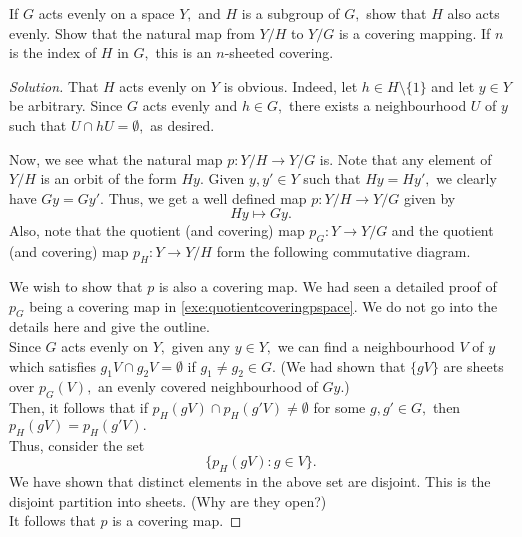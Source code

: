 \documentclass[12pt]{article}
\newenvironment{soln}{\begin{proof}[Solution]}{\end{proof}}
\begin{document}
\begin{exe} \label{exe:evenactionsubgroup}
	If $G$ acts evenly on a space $Y,$ and $H$ is a subgroup of $G,$ show that $H$ also acts evenly. Show that the natural map from $Y/H$ to $Y/G$ is a covering mapping. If $n$ is the index of $H$ in $G,$ this is an $n$-sheeted covering. 
\end{exe}
\begin{soln}
	That $H$ acts evenly on $Y$ is obvious. Indeed, let $h \in H\setminus\{1\}$ and let $y \in Y$ be arbitrary. Since $G$ acts evenly and $h \in G,$ there exists a neighbourhood $U$ of $y$ such that $U \cap hU = \emptyset,$ as desired. \par

	Now, we see what the natural map $p:Y/H \to Y/G$ is. Note that any element of $Y/H$ is an orbit of the form $Hy.$ Given $y, y' \in Y$ such that $Hy = Hy',$ we clearly have $Gy = Gy'.$ Thus, we get a well defined map $p:Y/H \to Y/G$ given by
	\begin{equation*} 
		Hy \mapsto Gy.
	\end{equation*}
	Also, note that the quotient (and covering) map $p_G:Y \to Y/G$ and the quotient (and covering) map $p_H: Y \to Y/H$ form the following commutative diagram.
	\begin{center}
	\end{center}
	We wish to show that $p$ is also a covering map. We had seen a detailed proof of $p_G$ being a covering map in \cref{exe:quotientcoveringpspace}. We do not go into the details here and give the outline.\\
	Since $G$ acts evenly on $Y,$ given any $y \in Y,$ we can find a neighbourhood $V$ of $y$ which satisfies $g_1V \cap g_2V = \emptyset$ if $g_1 \neq g_2 \in G.$ (We had shown that $\{gV\}$ are sheets over $p_G(V),$ an evenly covered neighbourhood of $Gy.$)  \\
	Then, it follows that if $p_H(gV) \cap p_H(g'V) \neq \emptyset$ for some $g, g' \in G,$ then $p_H(gV) = p_H(g'V).$\\
	Thus, consider the set
	\begin{equation*} 
		\{p_H(gV) : g \in V\}.
	\end{equation*}
	We have shown that distinct elements in the above set are disjoint. This is the disjoint partition into sheets. (Why are they open?)\\
	It follows that $p$ is a covering map.


\end{soln}
\end{document}
